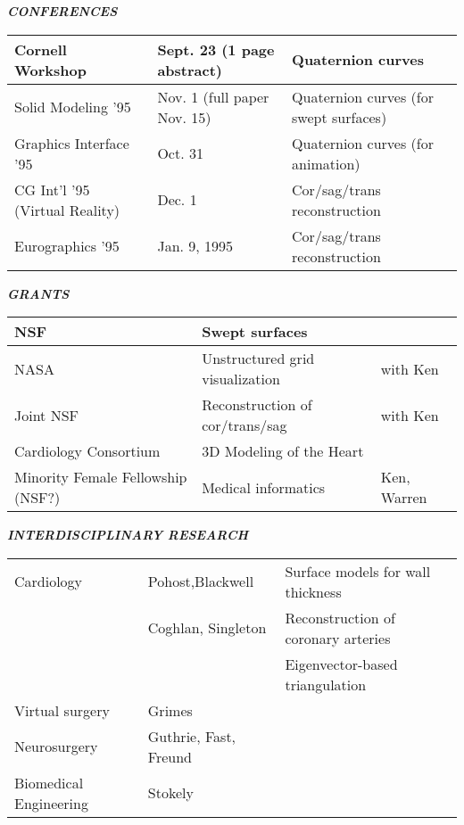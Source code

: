 \newcommand{\DoubleSpace}{\edef\baselinestretch{1.4}\Large\normalsize}

\setlength{\oddsidemargin}{-.25in}
\newcommand{\Comment}[1]{\relax}  %

\pagestyle{empty}

\centerline{\bf {\em CONFERENCES}}
\begin{table}[h]
\centering
\begin{tabular}{|l|l|l|}
\hline
Cornell Workshop & Sept. 23 (1 page abstract) & Quaternion curves \\
\hline
Solid Modeling '95 & Nov. 1 (full paper Nov. 15) & Quaternion curves (for swept surfaces) \\
\hline
Graphics Interface '95 & Oct. 31 & Quaternion curves (for animation) \\
\hline
CG Int'l '95 (Virtual Reality) & Dec. 1 & Cor/sag/trans reconstruction \\
\hline
Eurographics '95 & Jan. 9, 1995 & Cor/sag/trans reconstruction \\
\hline
\end{tabular}
\end{table}

\vspace{2in}

\centerline{\bf {\em GRANTS}}
\begin{table}[h]
\centering
\begin{tabular}{|l|l|l|}
\hline
NSF  & Swept surfaces & \\
\hline
NASA & Unstructured grid visualization & with Ken \\
\hline
Joint NSF & Reconstruction of cor/trans/sag & with Ken \\
\hline
Cardiology Consortium & 3D Modeling of the Heart & \\
\hline
Minority Female Fellowship (NSF?) & Medical informatics & Ken, Warren \\
\hline
\end{tabular}
\end{table}

\clearpage

\centerline{\bf {\em INTERDISCIPLINARY RESEARCH}}
\begin{table}[h]
\centering
\begin{tabular}{|l|l|l|}
\hline
Cardiology & Pohost,Blackwell & Surface models for wall thickness \\
& Coghlan, Singleton & Reconstruction of coronary arteries \\
& & Eigenvector-based triangulation \\
\hline
Virtual surgery & Grimes & \\
\hline
Neurosurgery & Guthrie, Fast, Freund & \\
\hline
Biomedical Engineering & Stokely & \\
\hline
\end{tabular}
\end{table}

